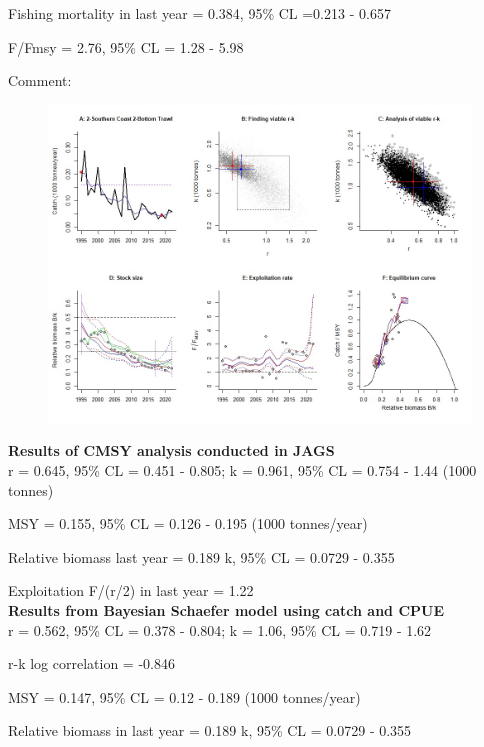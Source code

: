 \documentclass[12pt,a4paper]{article}\usepackage[]{graphicx}\usepackage[]{xcolor}
\begin{document}
Fishing mortality in last year = 0.384, 95\% CL =0.213 - 0.657

F/Fmsy  = 2.76, 95\% CL = 1.28 - 5.98 

 Comment:  

    \pagebreak

    \begin{figure}[ht]
    \centering
    \includegraphics[width=1.00\textwidth ext=.jpg type=jpg]{2-Southern Coast 2-Bottom Trawl_AN.jpg}
    \end{figure}

    \textbf{Results of CMSY analysis conducted in JAGS}\\

r = 0.645, 95\% CL = 0.451 - 0.805; k = 0.961, 95\% CL = 0.754 - 1.44 (1000 tonnes)

MSY = 0.155, 95\% CL = 0.126 - 0.195 (1000 tonnes/year)

Relative biomass last year = 0.189 k, 95\% CL = 0.0729 - 0.355

Exploitation F/(r/2) in last year = 1.22 \\

\textbf{Results from Bayesian Schaefer model using catch and CPUE}\\

r = 0.562, 95\% CL = 0.378 - 0.804; k = 1.06, 95\% CL = 0.719 - 1.62

r-k log correlation = -0.846

MSY = 0.147, 95\% CL = 0.12 - 0.189 (1000 tonnes/year)

Relative biomass in last year = 0.189 k, 95\% CL = 0.0729 - 0.355
\end{document}
